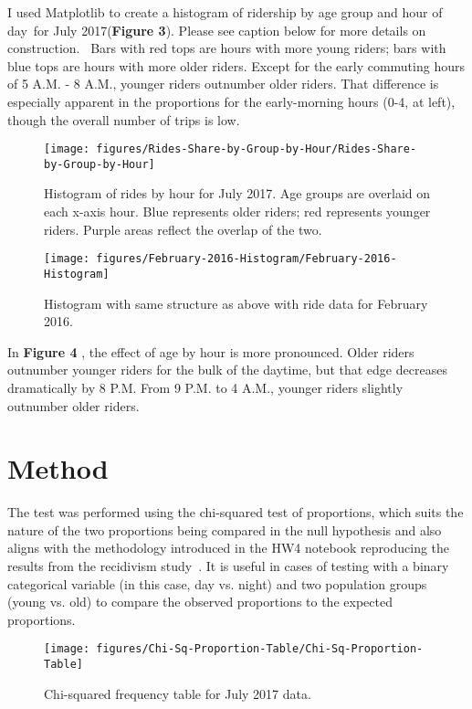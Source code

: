 \documentclass[10pt]{article}
\let\cite\citep
\providecommand\citep{\cite}
\begin{document}
I used Matplotlib to create a histogram of ridership by age group and
hour of day~for July 2017(\textbf{Figure 3}). Please see caption below
for more details on construction.~ Bars with red tops are hours with
more young riders; bars with blue tops are hours with more older riders.
Except for the early commuting hours of 5 A.M. - 8 A.M., younger riders
outnumber older riders. That difference is especially apparent in the
proportions for the early-morning hours (0-4, at left), though the
overall number of trips is low.
\begin{figure}[h!]
\begin{center}
\texttt{[image: figures/Rides-Share-by-Group-by-Hour/Rides-Share-by-Group-by-Hour]}
\caption{{Histogram of rides by hour for July 2017. Age groups are overlaid on
each x-axis hour. Blue represents older riders; red represents younger
riders. Purple areas reflect the overlap of the two.
{\label{125182}}%
}}
\end{center}
\end{figure}
\begin{figure}[h!]
\begin{center}
\texttt{[image: figures/February-2016-Histogram/February-2016-Histogram]}
\caption{{Histogram with same structure as above with ride data for February 2016.
{\label{311914}}%
}}
\end{center}
\end{figure}

In \textbf{Figure 4} , the effect of age by hour is more pronounced.
Older riders outnumber younger riders for the bulk of the daytime, but
that edge decreases dramatically by 8 P.M. From 9 P.M. to 4 A.M.,
younger riders slightly outnumber older riders.

\section*{Method}

{\label{687807}}

The test was performed using the chi-squared test of proportions, which
suits the nature of the two proportions being compared in the null
hypothesis and also aligns with the methodology introduced in the HW4
notebook reproducing the results from the recidivism
study~\cite{repository}. It is useful in cases of testing with a binary
categorical variable (in this case, day vs. night) and two population
groups (young vs. old) to compare the observed proportions to the
expected proportions.~
\begin{figure}[h!]
\begin{center}
\texttt{[image: figures/Chi-Sq-Proportion-Table/Chi-Sq-Proportion-Table]}
\caption{{Chi-squared frequency table for July 2017 data.
{\label{435461}}%
}}
\end{center}
\end{figure}
\end{document}
